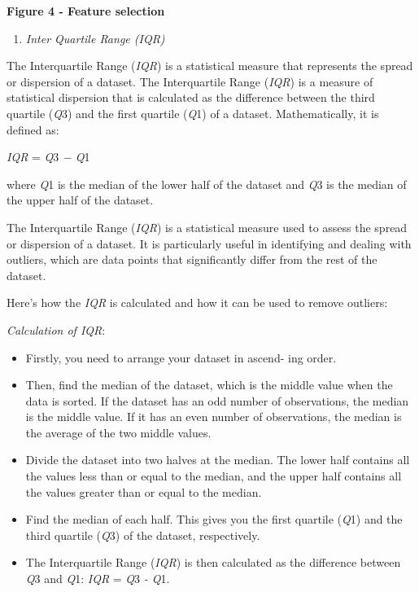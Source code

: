 {\bfseries Figure 4 - Feature selection}

\begin{enumerate}
\def\labelenumi{\Alph{enumi}.}
\setcounter{enumi}{4}
\item
  \emph{Inter Quartile Range (IQR)}
\end{enumerate}

The Interquartile Range (\emph{IQR}) is a statistical measure that
represents the spread or dispersion of a dataset. The Interquartile
Range (\emph{IQR}) is a measure of statistical dispersion that is
calculated as the difference between the third quartile (\emph{Q}3) and
the first quartile (\emph{Q}1) of a dataset. Mathematically, it is
defined as:

\emph{IQR} = \emph{Q}3 \emph{− Q}1

where \emph{Q}1 is the median of the lower half of the dataset and
\emph{Q}3 is the median of the upper half of the dataset.

The Interquartile Range (\emph{IQR}) is a statistical measure used to
assess the spread or dispersion of a dataset. It is particularly useful
in identifying and dealing with outliers, which are data points that
significantly differ from the rest of the dataset.

Here's how the \emph{IQR} is calculated and how it can be used to remove
outliers:

\emph{Calculation of IQR}:

\begin{itemize}
\item
  Firstly, you need to arrange your dataset in ascend- ing order.
\item
  Then, find the median of the dataset, which is the middle value when
  the data is sorted. If the dataset has an odd number of observations,
  the median is the middle value. If it has an even number of
  observations, the median is the average of the two middle values.
\item
  Divide the dataset into two halves at the median. The lower half
  contains all the values less than or equal to the median, and the
  upper half contains all the values greater than or equal to the
  median.
\item
  Find the median of each half. This gives you the first quartile
  (\emph{Q}1) and the third quartile (\emph{Q}3) of the dataset,
  respectively.
\item
  The Interquartile Range (\emph{IQR}) is then calculated as the
  difference between \emph{Q}3 and \emph{Q}1: \emph{IQR} = \emph{Q}3
  \emph{- Q}1.
\end{itemize}

